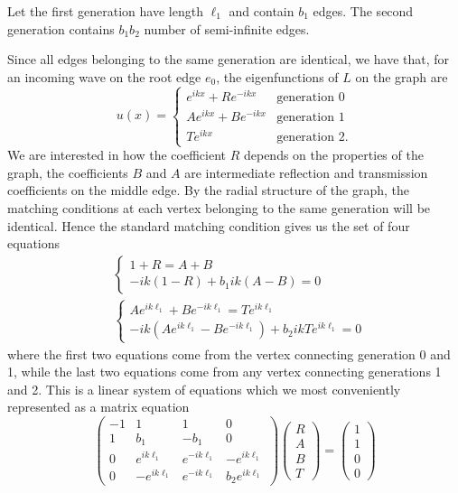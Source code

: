 Let the first generation have length $\ell_1$ and contain $b_1$ edges. The second generation contains $b_1b_2$ number of semi-infinite edges.

Since all edges belonging to the same generation are identical, we have that, for an incoming wave on the root edge $e_0$, the eigenfunctions of $L$ on the graph are
\begin{equation}
  u(x) = \begin{cases}
       e^{ikx} + Re^{-ikx}   & \text{generation 0} \\
    Ae^{ikx} + Be^{-ikx} & \text{generation 1} \\
    Te^{ikx}                 & \text{generation 2}.
  \end{cases}
\end{equation}
We are interested in how the coefficient $R$ depends on the properties of the graph, the coefficients $B$ and $A$ are intermediate reflection and transmission coefficients on the middle edge. By the radial structure of the graph, the matching conditions at each vertex belonging to the same generation will be identical. Hence the standard matching condition gives us the set of four equations
\begin{align}
  & \begin{cases}
    1+R = A+B \\
    -ik(1-R) + b_1 ik(A-B) = 0
  \end{cases} \\
  & \begin{cases}
    Ae^{ik\ell_1} + Be^{-ik\ell_1} = Te^{ik\ell_1} \\
    -ik(Ae^{ik\ell_1}-Be^{-ik\ell_1}) + b_2 ikTe^{ik\ell_1} = 0
  \end{cases}
\end{align}
where the first two equations come from the vertex connecting generation 0 and 1, while the last two equations come from any vertex connecting generations 1 and 2. This is a linear system of equations which we most conveniently represented as a matrix equation
\begin{equation}
  \begin{pmatrix}
    -1 & 1             & 1             & 0                \\
    1  & b_1           & -b_1          & 0                \\
    0  & e^{ik\ell_1}  & e^{-ik\ell_1} & -e^{ik\ell_1}    \\
    0  & -e^{ik\ell_1} & e^{-ik\ell_1} & b_2 e^{ik\ell_1}
  \end{pmatrix}
  \begin{pmatrix}
    R \\ A \\ B \\ T
  \end{pmatrix}
  =
  \begin{pmatrix}
    1 \\ 1 \\ 0 \\ 0
  \end{pmatrix}
\end{equation}
